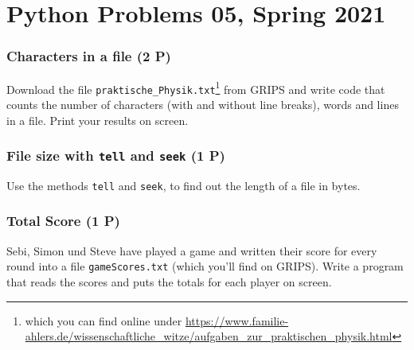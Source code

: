 \documentclass[
	ngerman,
	fontsize=10pt,
	parskip=half,
	titlepage=true,
	DIV=12
]{scrartcl}
\newcommand*{\inPy}[1]{\texttt{#1}}
\begin{document}
\part*{Python Problems 05, Spring 2021}
\section{Characters in a file (2 P)}
Download the file \texttt{praktische\_Physik.txt}\footnote{which you can find online under \url{https://www.familie-ahlers.de/wissenschaftliche_witze/aufgaben_zur_praktischen_physik.html}} from GRIPS and write code that counts the number of characters (with and without line breaks), words and lines in a file. Print your results on screen.

\section{File size with \inPy{tell} and \inPy{seek} (1 P)}
Use the methods \inPy{tell} and \inPy{seek}, to find out the length of a file in bytes.

\section{Total Score (1 P)}
Sebi, Simon und Steve have played a game and written their score for every round into a file \texttt{gameScores.txt} (which you'll find on GRIPS). Write a program that reads the scores and puts the totals for each player on screen.
\end{document}
